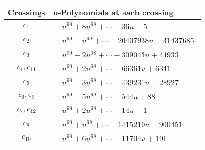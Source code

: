 \documentclass[1p]{elsarticle_modified}
\theoremstyle{definition}
\begin{document}
\begin{tabular}{m{50pt}|m{274pt}}
Crossings & \hspace{64pt}u-Polynomials at each crossing \\
\hline $$\begin{aligned}c_{1}\end{aligned}$$&$\begin{aligned}
&u^{99}+8 u^{98}+\cdots+36 u-5
\end{aligned}$\\
\hline $$\begin{aligned}c_{2}\end{aligned}$$&$\begin{aligned}
&u^{99}- u^{98}+\cdots-20407938 u-31437685
\end{aligned}$\\
\hline $$\begin{aligned}c_{3}\end{aligned}$$&$\begin{aligned}
&u^{99}-2 u^{98}+\cdots-309043 u+44933
\end{aligned}$\\
\hline $$\begin{aligned}c_{4},c_{11}\end{aligned}$$&$\begin{aligned}
&u^{99}+2 u^{98}+\cdots+66361 u+6341
\end{aligned}$\\
\hline $$\begin{aligned}c_{5}\end{aligned}$$&$\begin{aligned}
&u^{99}-3 u^{98}+\cdots-439231 u-28927
\end{aligned}$\\
\hline $$\begin{aligned}c_{6},c_{9}\end{aligned}$$&$\begin{aligned}
&u^{99}-5 u^{98}+\cdots-544 u+88
\end{aligned}$\\
\hline $$\begin{aligned}c_{7},c_{12}\end{aligned}$$&$\begin{aligned}
&u^{99}+2 u^{98}+\cdots-14 u-1
\end{aligned}$\\
\hline $$\begin{aligned}c_{8}\end{aligned}$$&$\begin{aligned}
&u^{99}+u^{98}+\cdots+1415210 u-900451
\end{aligned}$\\
\hline $$\begin{aligned}c_{10}\end{aligned}$$&$\begin{aligned}
&u^{99}+6 u^{98}+\cdots-11704 u+191
\end{aligned}$\\
\hline
\end{tabular}\\~\\
\end{document}
